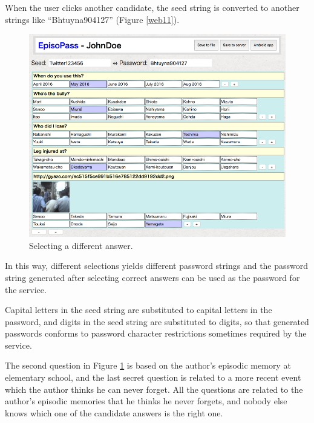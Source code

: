 \documentclass{sigchi}
\begin{document}
When the user clicks another candidate,
the seed string is converted to another strings like
``\textsf{Bhtuyna904127}'' (Figure \ref{web11}).

\begin{figure}[H]
\centering
\includegraphics[width=1.0\columnwidth]{figures/01e5507d090eb494a20bcbc47c86b1d2}
\caption{Selecting a different answer.}
\label{web1}
\end{figure}

In this way, different selections yields different password strings and
the password string generated after selecting correct answers can be
used as the password for the service.

Capital letters in the seed string are substituted to capital letters in the password,
and digits in the seed string are substituted to digits,
so that generated passwords conforms to password character restrictions
sometimes required by the service.


The second question in Figure \ref{web1}
is based on the author's episodic memory at elementary school,
and the last secret question is related to a more recent event
which the author thinks he can never forget.
All the questions are related to the author's episodic memories
that he thinks he never forgets, and nobody else knows which one of the
candidate answers is the right one.
\end{document}
